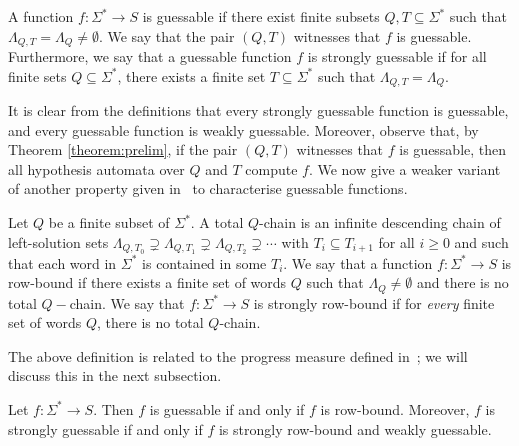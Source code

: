 \documentclass{lmcs}
\numberwithin{theorem}{section}
\begin{document}
\begin{defi}
A function $f: \Sigma^* \rightarrow S$ is guessable if there exist finite subsets $Q, T \subseteq \Sigma^*$ such that $\Lambda_{Q,T} = \Lambda_{Q} \neq \emptyset$. We say that the pair $(Q,T)$ witnesses that $f$ is guessable. Furthermore, we say that a guessable function $f$ is strongly guessable if for all finite sets $Q \subseteq \Sigma^*$, there exists a finite set $T \subseteq \Sigma^*$ such that $\Lambda_{Q,T} = \Lambda_{Q}$.
\end{defi}

It is clear from the definitions that every strongly guessable function is guessable, and every guessable function is weakly guessable. Moreover, observe that, by Theorem \ref{theorem:prelim}, if the pair $(Q, T)$ witnesses that $f$ is guessable, then all hypothesis automata over $Q$ and $T$ compute $f$.
We now give a weaker variant of another property given in~\cite{HKRS20} to characterise guessable functions.

\begin{defi}
Let $Q$ be a finite subset of $\Sigma^*$.
A total $Q$-chain is an infinite descending chain of left-solution sets $\Lambda_{Q, T_0} \supsetneq \Lambda_{Q, T_1} \supsetneq \Lambda_{Q, T_2} \supsetneq \cdots$  with $T_i \subseteq T_{i+1}$ for all $i \geq 0$ and such that each word in  $\Sigma^*$ is contained in some $T_i$.
We say that a function $f: \Sigma^* \rightarrow S$ is row-bound if there exists a finite set of words $Q$ such that 
$\Lambda_{Q} \neq \emptyset$
 and there is no total $Q-$chain.
We say that $f: \Sigma^* \rightarrow S$ is strongly row-bound if for \emph{every} finite set of words $Q$, there is no total $Q$-chain.
\end{defi}

The above definition is related to the progress measure defined in~\cite[Definition 11]{HKRS20}; we will discuss this in the next subsection.

\begin{prop}
\label{prop:guessable}
Let $f:\Sigma^* \to S$. Then $f$ is guessable if and only if $f$ is row-bound. Moreover, $f$ is strongly guessable if and only if $f$ is strongly row-bound and weakly guessable.
\end{prop}
\end{document}
